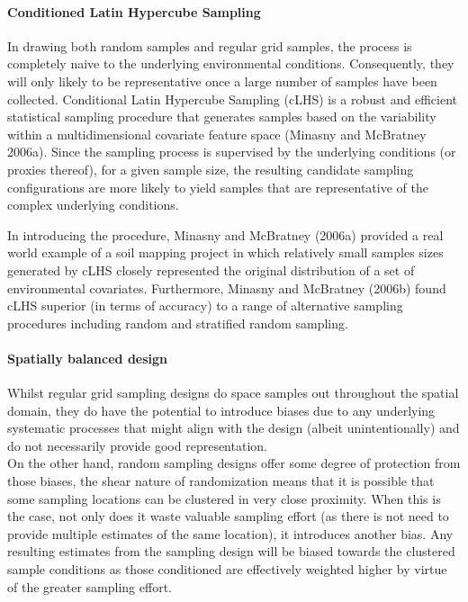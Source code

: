 \documentclass[a4paper]{article}
\begin{document}
\hypertarget{conditioned-latin-hypercube-sampling-1}{%
\paragraph{Conditioned Latin Hypercube
Sampling}\label{conditioned-latin-hypercube-sampling-1}}

In drawing both random samples and regular grid samples, the process is
completely naive to the underlying environmental conditions.
Consequently, they will only likely to be representative once a large
number of samples have been collected. Conditional Latin Hypercube
Sampling (cLHS) is a robust and efficient statistical sampling procedure
that generates samples based on the variability within a
multidimensional covariate feature space (Minasny and McBratney 2006a).
Since the sampling process is supervised by the underlying conditions
(or proxies thereof), for a given sample size, the resulting candidate
sampling configurations are more likely to yield samples that are
representative of the complex underlying conditions.

In introducing the procedure, Minasny and McBratney (2006a) provided a
real world example of a soil mapping project in which relatively small
samples sizes generated by cLHS closely represented the original
distribution of a set of environmental covariates. Furthermore, Minasny
and McBratney (2006b) found cLHS superior (in terms of accuracy) to a
range of alternative sampling procedures including random and stratified
random sampling.

\hypertarget{spatially-balanced-design-1}{%
\paragraph{Spatially balanced
design}\label{spatially-balanced-design-1}}

Whilst regular grid sampling designs do space samples out throughout the
spatial domain, they do have the potential to introduce biases due to
any underlying systematic processes that might align with the design
(albeit unintentionally) and do not necessarily provide good
representation.\\
On the other hand, random sampling designs offer some degree of
protection from those biases, the shear nature of randomization means
that it is possible that some sampling locations can be clustered in
very close proximity. When this is the case, not only does it waste
valuable sampling effort (as there is not need to provide multiple
estimates of the same location), it introduces another bias. Any
resulting estimates from the sampling design will be biased towards the
clustered sample conditions as those conditioned are effectively
weighted higher by virtue of the greater sampling effort.
\end{document}
